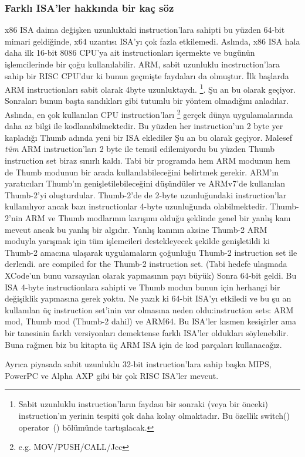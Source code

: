%
%
%

\subsubsection{Farklı \ac{ISA}'ler hakkında bir kaç söz}
x86 \ac{ISA} daima değişken uzunluktaki instruction'lara sahipti bu yüzden 64-bit mimari geldiğinde, x64 uzantısı \ac{ISA}'yı çok fazla etkilemedi. Aslında, x86 \ac{ISA} hala daha ilk 16-bit 8086 CPU'ya ait instructionları içermekte ve bugünün işlemcilerinde bir çoğu kullanılabilir.
ARM, sabit uzunluklu incstruction'lara sahip bir \ac{RISC} \ac{CPU}'dur ki bunun geçmişte faydaları da olmuştur.
İlk başlarda ARM instructionları sabit olarak 4byte uzunluktaydı.%
\footnote{
Sabit uzunluklu instruction'ların faydası bir sonraki (veya bir önceki) instruction'ın yerinin tespiti çok daha kolay olmaktadır. Bu özellik switch() operator~()  bölümünde tartışılacak.
}.
Şu an bu  olarak geçiyor.
Sonraları bunun başta sandıkları gibi tutumlu bir yöntem olmadığını anladılar.
Aslında, en çok kullanılan \ac{CPU} instruction'ları \footnote{e.g. MOV/PUSH/CALL/Jcc} gerçek dünya uygulamalarında daha az bilgi ile kodlanabilmektedir.
Bu yüzden her instruction'un 2 byte yer kapladığı Thumb adında yeni bir \ac{ISA} eklediler
Şu an bu  olarak geçiyor.
Malesef \emph{tüm} ARM instruction'ları 2 byte ile temsil edilemiyordu bu yüzden Thumb instruction set biraz sınırlı kaldı.
Tabi bir programda hem ARM modunun hem de Thumb modunun bir arada kullanılabileceğini belirtmek gerekir.
ARM'ın yaratıcıları Thumb'ın genişletilebileceğini düşündüler ve ARMv7'de kullanılan Thumb-2'yi oluşturdular. 
Thumb-2'de de 2-byte uzunluğundaki instruction'lar kullanılıyor ancak bazı instructionlar 4-byte uzunluğunda olabilmektedir.
Thumb-2'nin ARM ve Thumb modlarının karışımı olduğu şeklinde genel bir yanlış kanı mevcut ancak bu yanlış bir algıdır.
Yanlış kanının aksine Thumb-2 ARM moduyla yarışmak için tüm işlemcileri destekleyecek şekilde genişletildi ki Thumb-2 amacına ulaşarak \idevices uygulamaların çoğunluğu Thumb-2 instruction set ile derlendi.
are compiled for the Thumb-2 instruction set. (Tabi hedefe ulaşmada XCode'un bunu varsayılan olarak yapmasının payı büyük)
Sonra 64-bit geldi. Bu \ac{ISA} 4-byte instructionlara sahipti ve Thumb modun bunun için herhangi bir değişiklik yapmasına gerek yoktu.
Ne yazık ki 64-bit \ac{ISA}'yı etkiledi ve bu şu an kullanılan üç instruction set'inin var olmasına neden oldu:instruction sets: ARM mod, Thumb mod (Thumb-2 dahil) ve ARM64.
Bu \ac{ISA}'ler kısmen kesişirler ama bir tanesinin farklı versiyonları demektense farklı \ac{ISA}'ler oldukları söylenebilir.
Buna rağmen biz bu kitapta üç ARM \ac{ISA} için de kod parçaları kullanacağız.

%
%
%
Ayrıca piyasada sabit uzunluklu 32-bit instruction'lara sahip başka MIPS, PowerPC ve Alpha AXP gibi bir çok \ac{RISC} \ac{ISA}'ler mevcut. 